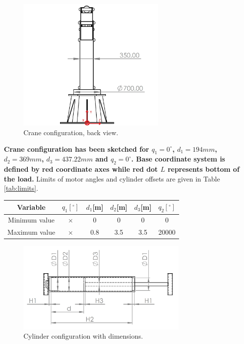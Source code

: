 \documentclass{article}
\begin{document}
	\begin{figure}[h!]
		\centering
		\includegraphics[width=0.65\textwidth]{kran_nacrt.jpg}
		\caption{Crane configuration, back view.}
		\label{fig:crane_back}
	\end{figure}
	
	\noindent
	\textbf{Crane configuration has been sketched for $q_1 = 0 ^\circ$, $d_1 = 
	194mm$, $d_2 = 369mm$, $d_3 = 437.22mm$ and $q_2 = 0 ^\circ$. Base 
	coordinate system is defined by red coordinate axes while red dot $L$ 
	represents bottom of the load.} Limits of motor angles and cylinder offsets 
	are given in Table \ref{tab:limits}.
	
	\begin{center}
		\label{tab:limits}
		\begin{tabular}{|| c || c c c c c ||}
			\hline
			Variable & $q_1[^{\circ}]$ & $d_1$[m] & $d_2$[m] & $d_3$[m] &  
			$q_2[^{\circ}]$\\
			\hline\hline
			Minimum value & $\times$ & 0 & 0 & 0 & 0 \\ 
			\hline
			Maximum value & $\times$ & 0.8 & 3.5 & 3.5 & 20000 \\ 
			\hline
		\end{tabular}
	\end{center}
	
	\begin{figure}
		\centering
		\includegraphics[width=0.75\textwidth]{cilindar_shema.jpg}
		\caption{Cylinder configuration with dimensions.}
		\label{fig:cylinder_conf}
	\end{figure}
	
\end{document}
